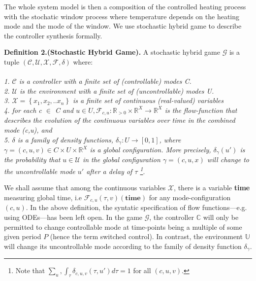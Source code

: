     The whole system model is then a composition of the controlled heating 
    process with the stochatic window process where temperature depends on 
    the heating mode and the mode of the window. We use stochastic hybrid 
    game to describe the controller synthesis formally.






    \textbf{Definition 2.(Stochastic Hybrid Game).} A stochastic hybrid game $\mathcal{G}$ is a
    tuple $(\mathcal{C,U,X,F},\delta)$ where:
    \\
    \\
    \emph{1. $\mathcal{C}$ is a controller with a finite set of (controllable) modes C.} \\
    \emph{2. $\mathcal{U}$ is the environment with a finite set of (uncontrollable) modes U.} \\
    \emph{3. $\mathcal{X} = \left\lbrace x_1,x_2,..x_n \right\rbrace$ is a finite set of
    continuous (real-valued) variables } \\
    \emph{4. for each c $\in$ C and $u \in U, \mathcal{F}_{c,u} : \mathbb{R}_{>0}
      \times \mathbb{R}^X \rightarrow\mathbb{R}^X$ 
        is the flow-function that describes the evolution of the continuous variables
        over time in the combined mode (c,u), and} \\
    \emph{5. $\delta$ is a family of density functions, $\delta_\gamma: 
    U \rightarrow 
    [0,1]$, where $ \gamma = (c,u,v) \in C \times U
    \times \mathbb{R}^X$ is a global configuration.
    More precisely, $\delta_{\gamma}(u')$ is the probability that $u \in \mathcal{U}$
    in the global configuration $ \gamma = (c,u,x)$ will change to the
      uncontrollable mode $u'$ after a delay of $\tau$ 
      \footnote{Note that $\sum_u,\int_{\tau}\delta_{c,u,v}(\tau,u')d\tau = 1$ for all $(c,u,v)$.}}.

    We shall assume that among the continuous variables $\mathcal{X}$, there is a variable
    \textbf{time} measuring global time, i.e $\mathcal{F}_{c,u}(\tau,v)(\textbf{time})$ 
    for any mode-configuration $(c,u)$. In the above definition, the syntatic specification
    of flow functions---e.g. using ODEs---has been left open. In the game $\mathcal{G}$,
    the controller $\mathbb{C}$ will only be permitted to change controllable mode at time-points
    being a multiple of some given period $P$ (hence the term switched control). In contrast,
    the environment $\mathbb{U}$ will change its uncontrollable mode according to the 
    family of density function $\delta_\gamma$.
    
